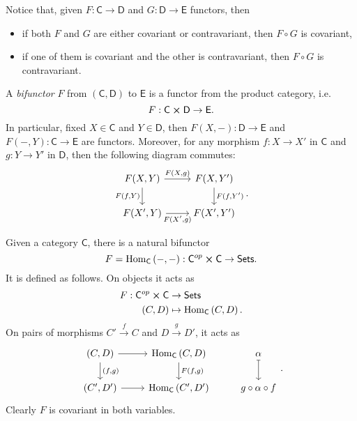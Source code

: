 \begin{rem}
	Notice that, given $F: \mathsf{C} \to \mathsf{D}$ and $G: \mathsf{D} \to \mathsf{E}$ functors, then
	\begin{itemize}
		\item if both $F$ and $G$ are either covariant or contravariant, then $F \circ G$ is covariant,
		\item if one of them is covariant and the other is contravariant, then $F \circ G$ is contravariant.
	\end{itemize}
\end{rem}

\begin{defn}[Bifunctor]
	A {\em bifunctor} $F$ from $\left(\mathsf{C}, \mathsf{D}\right)$ to $\mathsf{E}$ is a functor from the product category, i.e.
	\begin{equation}
	F: \mathsf{C}\cross \mathsf{D} \to \mathsf{E} 
	.\end{equation}
	In particular, fixed $X \in \mathsf{C}$ and $Y \in \mathsf{D}$,
	then $F \left(X, - \right): \mathsf{D} \to \mathsf{E}$ and
	$F \left( - , Y \right): \mathsf{C} \to \mathsf{E}$ are functors.
	Moreover, for any morphism $f: X \to X'$ in $\mathsf{C}$ and
	$g: Y \to Y'$ in $\mathsf{D}$, then the following diagram commutes:
	\begin{equation}
	\begin{tikzcd}
		F(X,Y) \arrow[r, "{F(X,g)}", rightarrow]\arrow[d, "{F(f,Y)}"', rightarrow] & F(X,Y')\arrow[d, "{F(f,Y')}", rightarrow] \\
		F(X',Y) \arrow[r, "{F(X',g)}"', rightarrow] & F(X',Y')
	\end{tikzcd}
	.\end{equation} 
\end{defn}

\begin{ex}
	Given a category $\mathsf{C}$, there is a natural bifunctor
	\begin{equation}
	F = \mathrm{Hom}_{\mathsf{C}} \left( -, - \right): \mathsf{C}^{op} \cross \mathsf{C} \to \mathsf{Sets}
	.\end{equation} 
	It is defined as follows.
	On objects it acts as
	\begin{align}
		F: \mathsf{C}^{op} \cross \mathsf{C} &\to \mathsf{Sets} \\
		\left(C, D\right) &\mapsto \mathrm{Hom}_{\mathsf{C}} \left( C, D \right)
	.\end{align} 
	On pairs of morphisms $C' \xrightarrow{f} C$ and $D \xrightarrow{g} D'$, it acts as
	\begin{equation}
	\begin{tikzcd}
		\left(C, D\right) \arrow[r, "", rightarrow] \arrow[d, "{(f,g)}", rightarrow] &
		\mathrm{Hom}_{\mathsf{C}} \left( C, D \right) \arrow[d, "{F(f,g)}", rightarrow] &
		\alpha \arrow[d, "", mapsto]\\
		\left(C', D'\right) \arrow[r, "", rightarrow] &
		\mathrm{Hom}_{\mathsf{C}} \left( C', D' \right) &
		g \circ \alpha \circ f
	\end{tikzcd}
	.\end{equation} 
	Clearly $F$ is covariant in both variables.
\end{ex} 	

